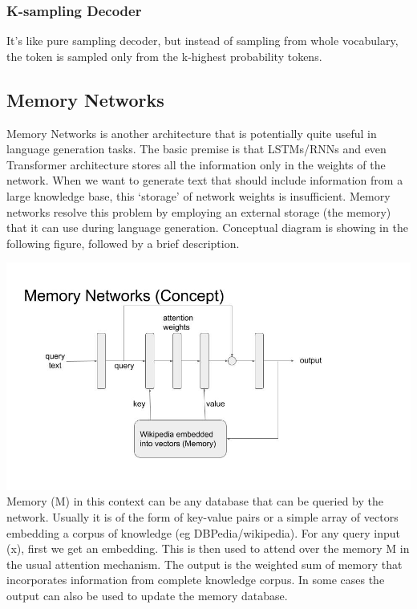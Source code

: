 \documentclass[]{krantz}
\begin{document}
\hypertarget{k-sampling-decoder}{%
\subsubsection{K-sampling Decoder}\label{k-sampling-decoder}}

It's like pure sampling decoder, but instead of sampling from whole vocabulary, the token is sampled only from the k-highest probability tokens.

\hypertarget{memory-networks}{%
\subsection{Memory Networks}\label{memory-networks}}

Memory Networks is another architecture that is potentially quite useful in language generation tasks. The basic premise is that LSTMs/RNNs and even Transformer architecture stores all the information only in the weights of the network. When we want to generate text that should include information from a large knowledge base, this `storage' of network weights is insufficient. Memory networks resolve this problem by employing an external storage (the memory) that it can use during language generation. Conceptual diagram is showing in the following figure, followed by a brief description.

\includegraphics{figures/04-01-use-case1/memory_networks.jpg}
Memory (M) in this context can be any database that can be queried by the network. Usually it is of the form of key-value pairs or a simple array of vectors embedding a corpus of knowledge (eg DBPedia/wikipedia). For any query input (x), first we get an embedding. This is then used to attend over the memory M in the usual attention mechanism. The output is the weighted sum of memory that incorporates information from complete knowledge corpus. In some cases the output can also be used to update the memory database.
\end{document}
